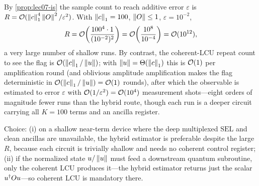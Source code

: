 \begin{solution}
By \cref{prop:lec07-is} the sample count to reach additive error $\varepsilon$ is
$R=\mathcal{O}(\left\lVert c \right\rVert_1^4\left\lVert O \right\rVert^2/\varepsilon^2)$. With $\left\lVert c \right\rVert_1=100$,
$\left\lVert O \right\rVert\le1$, $\varepsilon=10^{-2}$,
\[
  R=\mathcal{O}\!\left(\frac{100^4\cdot1}{(10^{-2})^2}\right)
   =\mathcal{O}\!\left(\frac{10^{8}}{10^{-4}}\right)=\mathcal{O}(10^{12}),
\]
a very large number of shallow runs. By contrast, the coherent-LCU repeat count to
see the flag is $\mathcal{O}(\left\lVert c \right\rVert_1/\left\lVert u \right\rVert)$; with $\left\lVert u \right\rVert=\Theta(\left\lVert c \right\rVert_1)$ this
is $\mathcal{O}(1)$ per amplification round (and oblivious amplitude amplification makes the
flag deterministic in $\mathcal{O}(\left\lVert c \right\rVert_1/\left\lVert u \right\rVert)=\mathcal{O}(1)$ rounds), after which the
observable is estimated to error $\varepsilon$ with $\mathcal{O}(1/\varepsilon^2)=\mathcal{O}(10^4)$
measurement shots---eight orders of magnitude fewer runs than the hybrid route, though
each run is a deeper circuit carrying all $K=100$ terms and an ancilla register.

Choice: (i) on a shallow near-term device where the deep multiplexed $\mathrm{SEL}$
and clean ancillas are unavailable, the hybrid estimator is preferable despite the
large $R$, because each circuit is trivially shallow and needs no coherent control
register; (ii) if the normalized state $u/\left\lVert u \right\rVert$ must feed a downstream quantum
subroutine, only the coherent LCU produces it---the hybrid estimator returns just the
scalar $u^{\dagger} Ou$---so coherent LCU is mandatory there.
\end{solution}
